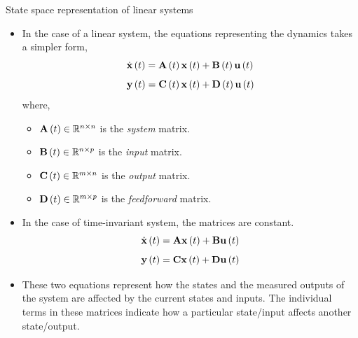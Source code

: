 \documentclass[aspectratio=169]{beamer}
\def\mf{\ensuremath\mathbf}
\def\mb{\ensuremath\mathbb}
\def\lp{\ensuremath\left(}
\def\rp{\ensuremath\right)}
\newcommand{\ct}[1]{\lp #1\rp}
\begin{document}
\begin{frame}{State space representation of linear systems}
\begin{itemize}
    \item In the case of a linear system, the equations representing the dynamics takes a simpler form,
    \[ \dot{\mf{x}}\ct{t} = \mf{A}\ct{t}\mf{x}\ct{t} + \mf{B}\ct{t}\mf{u}\ct{t} \]
    \[ \mf{y}\ct{t} = \mf{C}\ct{t}\mf{x}\ct{t} + \mf{D}\ct{t}\mf{u}\ct{t} \]
    where, 
    \begin{itemize}
        \item $\mf{A}\ct{t} \in \mb{R}^{n \times n}$ is the \textit{system} matrix.
        \item $\mf{B}\ct{t} \in \mb{R}^{n \times p}$ is the \textit{input} matrix.
        \item $\mf{C}\ct{t} \in \mb{R}^{m \times n}$ is the \textit{output} matrix.
        \item $\mf{D}\ct{t} \in \mb{R}^{m \times p}$ is the \textit{feedforward} matrix.
    \end{itemize}

    \item In the case of time-invariant system, the matrices are constant.
    \[ \dot{\mf{x}}\ct{t} = \mf{A}\mf{x}\ct{t} + \mf{B}\mf{u}\ct{t} \]
    \[ \mf{y}\ct{t} = \mf{C}\mf{x}\ct{t} + \mf{D}\mf{u}\ct{t} \]

    \item These two equations represent how the states and the measured outputs of the system are affected by the current states and inputs. The individual terms in these matrices indicate how a particular state/input affects another state/output.
\end{itemize}
\end{frame}
\end{document}
